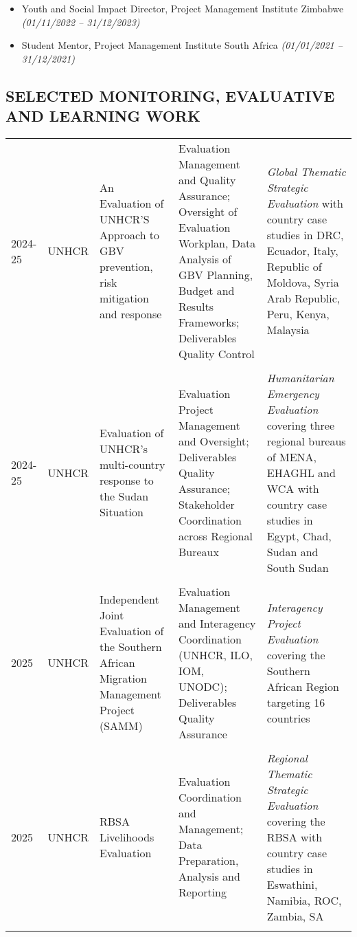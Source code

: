 \documentclass[
  10pt,
]{article}
\begin{document}
\begin{itemize}[itemsep=0.25em, topsep=0.25em]
  \item Youth and Social Impact Director, Project Management Institute Zimbabwe \textit{(01/11/2022 – 31/12/2023)}
  \item Student Mentor, Project Management Institute South Africa \textit{(01/01/2021 – 31/12/2021)}
\end{itemize}

\clearpage
\begin{landscape}

\section{SELECTED MONITORING, EVALUATIVE AND LEARNING WORK}
\begin{tabularx}{\linewidth}{|l|l|X|X|X|}
\hline
2024-25 & UNHCR & An Evaluation of UNHCR'S Approach to GBV prevention, risk mitigation and response & Evaluation Management and Quality Assurance; Oversight of Evaluation Workplan, Data Analysis of GBV Planning, Budget and Results Frameworks; Deliverables Quality Control & \emph{Global Thematic Strategic Evaluation} with country case studies in DRC, Ecuador, Italy, Republic of Moldova, Syria Arab Republic, Peru, Kenya, Malaysia \\ &&&&  \\

2024-25 & UNHCR & Evaluation of UNHCR's multi-country response to the Sudan Situation & Evaluation Project Management and Oversight; Deliverables Quality Assurance; Stakeholder Coordination across Regional Bureaux  & \emph{Humanitarian Emergency Evaluation} covering three regional bureaus of MENA, EHAGHL and WCA with country case studies in Egypt, Chad, Sudan and South Sudan \\ &&&&  \\

2025 & UNHCR & Independent Joint Evaluation of the Southern African Migration Management Project (SAMM) & Evaluation Management and Interagency Coordination (UNHCR, ILO, IOM, UNODC); Deliverables Quality Assurance & \emph{Interagency Project Evaluation} covering the Southern African Region targeting 16 countries \\ &&&&  \\

2025 & UNHCR & RBSA Livelihoods Evaluation & Evaluation Coordination and Management; Data Preparation, Analysis and Reporting & \emph{Regional Thematic Strategic Evaluation} covering the RBSA with country case studies in Eswathini, Namibia, ROC, Zambia, SA \\ &&&& \\


\end{tabularx}
\end{landscape}
\end{document}
